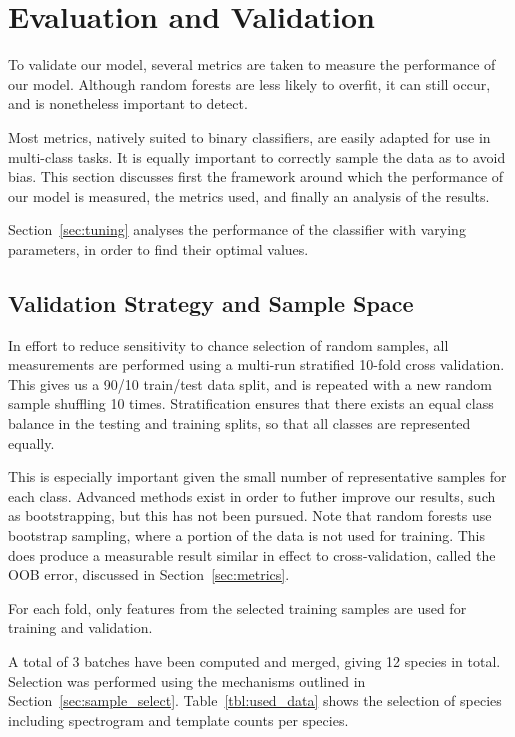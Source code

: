 \section{ Evaluation and Validation}\label{sec:acc_eval}
To validate our model, several metrics are taken to measure the performance of
our model.
Although random forests are less likely to overfit, it can still occur, and is
nonetheless important to detect.

Most metrics, natively suited to binary classifiers, are easily adapted for use
in multi-class tasks.
It is equally important to correctly sample the data as to avoid bias.
This section discusses first the framework around which the performance of our
model is measured, the metrics used, and finally an analysis of the results.

Section~\ref{sec:tuning} analyses the performance of the classifier with varying
parameters, in order to find their optimal values.

\subsection{Validation Strategy and Sample Space}
In effort to reduce sensitivity to chance selection of random samples, all
measurements are performed using a multi-run stratified 10-fold cross validation.
This gives us a 90/10 train/test data split, and is repeated with a new random
sample shuffling 10 times.
Stratification ensures that there exists an equal class balance in the testing
and training splits, so that all classes are represented equally.

This is especially important given the small number of representative samples
for each class.
Advanced methods exist in order to futher improve our results, such as
bootstrapping, but this has not been pursued.
Note that random forests use bootstrap sampling, where a portion of the data is
not used for training.
This does produce a measurable result similar in effect to cross-validation,
called the OOB error, discussed in Section~\ref{sec:metrics}.

For each fold, only features from the selected training samples are
used for training and validation.

A total of 3 batches have been computed and merged, giving 12 species in total.
Selection was performed using the mechanisms outlined in
Section~\ref{sec:sample_select}.
Table~\ref{tbl:used_data} shows the selection of species including spectrogram
and template counts per species.

